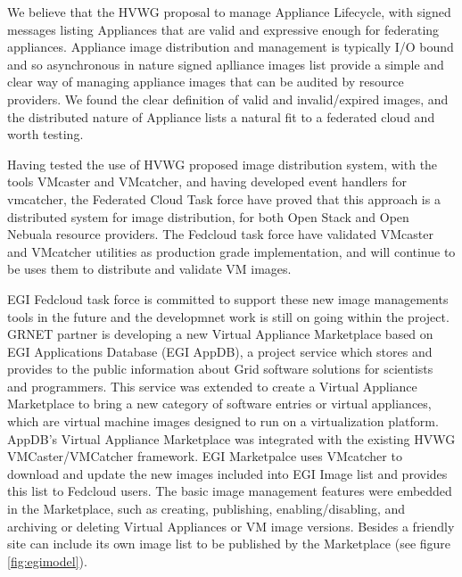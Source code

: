 \documentclass{cai}
\begin{document}
We believe that the HVWG proposal to manage Appliance Lifecycle, with signed messages listing Appliances that are valid and expressive enough for federating appliances. 
Appliance image distribution and management is typically I/O bound and so asynchronous in nature signed aplliance images list provide a simple and clear way of managing appliance images that can be audited by resource providers. 
We found the clear definition of valid and invalid/expired images, and the distributed nature of Appliance lists a natural fit to a federated cloud and worth testing.

Having tested the use of HVWG proposed image distribution system, with the tools VMcaster and VMcatcher, and having developed event handlers for vmcatcher, the Federated Cloud Task force have proved that this approach is a distributed system for image distribution, for both Open Stack and Open Nebuala resource providers. 
The Fedcloud task force have validated VMcaster and VMcatcher utilities as production grade implementation, and will continue to be uses them to distribute and validate VM images.

EGI Fedcloud task force is committed to support these new image managements tools in the future and the developmnet work is still on going within the project. 
GRNET partner is developing a new Virtual Appliance Marketplace based on EGI Applications Database (EGI AppDB), a project service which stores and provides to the public information about Grid software solutions for scientists and programmers.
This service was extended to create a Virtual Appliance Marketplace to bring a new category of software entries or virtual appliances, which are virtual machine images designed to run on a virtualization platform.
AppDB's Virtual Appliance Marketplace was integrated with the existing HVWG VMCaster/VMCatcher framework.
EGI Marketpalce uses VMcatcher to download and update the new images included into EGI Image list and provides this list to Fedcloud users.  
The basic image management features were embedded in the Marketplace, such as creating, publishing, enabling/disabling, and archiving or deleting Virtual Appliances or VM image versions.
Besides a friendly site can include its own image list to be published by the Marketplace (see figure \ref{fig:egimodel}). 
\end{document}
